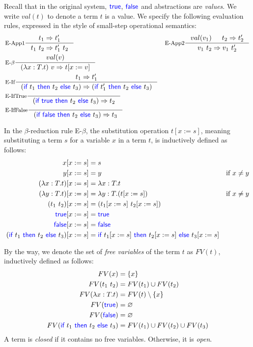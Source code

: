 \documentclass[11pt]{article}
\let\emptyset\varnothing
\let\reduce\Rightarrow
\newcommand{\kword}[1]{{\color{blue} \textsf{#1}}}
\newcommand{\True}{\kword{true}}
\newcommand{\False}{\kword{false}}
\newcommand{\If}{\kword{if}}
\newcommand{\Then}{\kword{then}}
\newcommand{\Else}{\kword{else}}
\begin{document}
Recall that in the original system, $\True$, $\False$ and abstractions are \emph{values}.
We write $val(t)$ to denote a term $t$ is a value.
We specify the following evaluation rules, expressed in the style of small-step operational semantics:
\begin{align*}
    &\inference[E-App1]{t_1 \reduce t_1'}{t_1~t_2 \reduce t_1'~t_2}
    &\inference[E-App2]{val(v_1) & t_2 \reduce t_2'}{v_1~t_2 \reduce v_1~t_2'} \\
    &\inference[E-$\beta$]{val(v)}{(\lambda x:T.t)~v \reduce t[x:=v]} \\
    &\inference[E-If]{t_1 \reduce t_1'}{(\If~t_1~\Then~t_2~\Else~t_3) \reduce (\If~t_1'~\Then~t_2~\Else~t_3)} \\
    &\inference[E-IfTrue]{}{(\If~\True~\Then~t_2~\Else~t_3) \reduce t_2} \\
    &\inference[E-IfFalse]{}{(\If~\False~\Then~t_2~\Else~t_3) \reduce t_3}
\end{align*}

In the $\beta$-reduction rule E-$\beta$, the substitution operation $t[x:=s]$, meaning substituting a term $s$ for a variable $x$ in a term $t$, is inductively defined as follows:
\begin{align*}
    x[x:=s] &= s \\
    y[x:=s] &= y & \text{if}~x\not=y \\
    (\lambda x:T.t)[x:=s] &= \lambda x:T.t \\
    (\lambda y:T.t)[x:=s] &= \lambda y:T.(t[x:=s]) & \text{if}~x\not=y \\
    (t_1~t_2)[x:=s] &= (t_1[x:=s]~t_2[x:=s]) \\
    \True[x:=s] &= \True \\
    \False[x:=s] &= \False \\
    (\If~t_1~\Then~t_2~\Else~t_3)[x:=s] &= \If~t_1[x:=s]~\Then~t_2[x:=s]~\Else~t_3[x:=s]
\end{align*}

By the way, we denote the set of \emph{free variables} of the term $t$ as $FV(t)$, inductively defined as follows:
\begin{align*}
    FV(x) &= \{x\} \\
    FV(t_1~t_2) &= FV(t_1) \cup FV(t_2) \\
    FV(\lambda x:T.t) &= FV(t) \setminus \{x\} \\
    FV(\True) &= \emptyset \\
    FV(\False) &= \emptyset \\
    FV(\If~t_1~\Then~t_2~\Else~t_3) &= FV(t_1) \cup FV(t_2) \cup FV(t_3)
\end{align*}
A term is \emph{closed} if it contains no free variables. Otherwise, it is \emph{open}.
\end{document}
